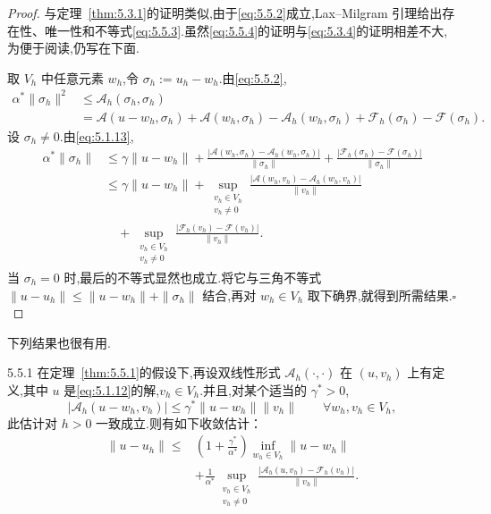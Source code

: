 \begin{proof}
与定理~\ref{thm:5.3.1}的证明类似,由于\eqref{eq:5.5.2}成立,Lax--Milgram 引理给出存在性、唯一性和不等式\eqref{eq:5.5.3}.虽然\eqref{eq:5.5.4}的证明与\eqref{eq:5.3.4}的证明相差不大,为便于阅读,仍写在下面.

取 \(V_h\) 中任意元素 \(w_h\),令 \(\sigma_h:=u_h-w_h\).由\eqref{eq:5.5.2},
\[
  \begin{aligned}
    \alpha^*\|\sigma_h\|^2&\le\mathcal A_h(\sigma_h,\sigma_h)\\
      &=\mathcal A(u-w_h,\sigma_h)+\mathcal A(w_h,\sigma_h)
         -\mathcal A_h(w_h,\sigma_h)+\mathcal F_h(\sigma_h)-\mathcal F(\sigma_h).
  \end{aligned}
\]
设 \(\sigma_h\ne0\).由\eqref{eq:5.1.13},
\[
  \begin{aligned}
    \alpha^*\|\sigma_h\|
    &\le\gamma\|u-w_h\|
      +\frac{|\mathcal A(w_h,\sigma_h)-\mathcal A_h(w_h,\sigma_h)|}{\|\sigma_h\|}
      +\frac{|\mathcal F_h(\sigma_h)-\mathcal F(\sigma_h)|}{\|\sigma_h\|}\\
    &\le\gamma\|u-w_h\|+
       \sup_{\substack{v_h\in V_h\\v_h\ne0}}
          \frac{|\mathcal A(w_h,v_h)-\mathcal A_h(w_h,v_h)|}{\|v_h\|}\\
    &\quad+\sup_{\substack{v_h\in V_h\\v_h\ne0}}
        \frac{|\mathcal F_h(v_h)-\mathcal F(v_h)|}{\|v_h\|}.
  \end{aligned}
\]
当 \(\sigma_h=0\) 时,最后的不等式显然也成立.将它与三角不等式
\(\|u-u_h\|\le\|u-w_h\|+\|\sigma_h\|\) 结合,再对 \(w_h\in V_h\) 取下确界,就得到所需结果.\hfill\(\square\)
\end{proof}

下列结果也很有用.

\begin{proposition}[]{5.5.1}
在定理~\ref{thm:5.5.1}的假设下,再设双线性形式 \(\mathcal A_h(\cdot,\cdot)\) 在 \((u,v_h)\) 上有定义,其中 \(u\) 是\eqref{eq:5.1.12}的解,\(v_h\in V_h\).并且,对某个适当的 \(\gamma^*>0\),
\begin{equation}\label{eq:5.5.5}
  |\mathcal A_h(u-w_h,v_h)|\le\gamma^*\|u-w_h\|\|v_h\|
    \qquad\forall w_h,v_h\in V_h,
\end{equation}
此估计对 \(h>0\) 一致成立.则有如下收敛估计：
\begin{equation}\label{eq:5.5.6}
  \begin{aligned}
    \|u-u_h\|\le{}&\left(1+\frac{\gamma^*}{\alpha^*}\right)
                    \inf_{w_h\in V_h}\|u-w_h\|\\
      &+\frac1{\alpha^*}\sup_{\substack{v_h\in V_h\\v_h\ne0}}
          \frac{|\mathcal A_h(u,v_h)-\mathcal F_h(v_h)|}{\|v_h\|}.
  \end{aligned}
\end{equation}
\end{proposition}

